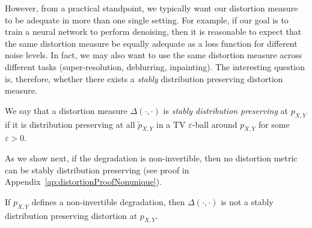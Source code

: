 However, from a practical standpoint, we typically want our distortion measure to be adequate in more than one single setting. For example, if our goal is to train a neural network to perform denoising, then it is reasonable to expect that the same distortion measure be equally adequate as a loss function for different noise levels. In fact, we may also want to use the same distortion measure across different tasks (\eg super-resolution, deblurring, inpainting). The interesting question is, therefore, whether there exists a \emph{stably} distribution preserving distortion measure.
\begin{definition}
We say that a distortion measure $\Delta(\cdot,\cdot)$ is \emph{stably distribution preserving} at $p_{X,Y}$ if it is distribution preserving at all $\tilde{p}_{X,Y}$ in a TV $\varepsilon$-ball around $p_{X,Y}$ for some $\varepsilon>0$.
\end{definition}

As we show next, if the degradation is non-invertible, then no distortion metric can be stably distribution preserving (see proof in Appendix~\ref{ap:distortionProofNonunique}).
\begin{theorem}\label{thm:arbitraryDistortion}
	If $p_{X,Y}$ defines a non-invertible degradation, then $\Delta(\cdot,\cdot)$ is not a stably distribution preserving distortion at $p_{X,Y}$.
\end{theorem}
